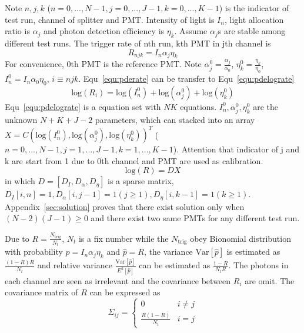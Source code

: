 Note $n,j,k$ ($n=0,...,N-1, j=0,...,J-1, k=0,...,K-1$) is the indicator of test run, channel of splitter and PMT. Intensity of light is $I_n$, light allocation ratio is $\alpha_j$ and photon detection efficiency is $\eta_k$. Assume $\alpha_j$s are stable among different test runs. The trigger rate of nth run, kth PMT in jth channel is
\begin{equation}
    \label{equ:pderate}
    R_{njk}=I_n\alpha_j\eta_k
\end{equation}
For convenience, 0th PMT is the reference PMT. Note $\alpha_j^0=\frac{\alpha_j}{\alpha_0}$, $\eta_k^0=\frac{\eta_k}{\eta_0}$, $I_n^0=I_n\alpha_0\eta_0$, $i\equiv njk$. Equ~\eqref{equ:pderate} can be transfer to Equ~\eqref{equ:pdelograte}
\begin{equation}
    \label{equ:pdelograte}
    \mathrm{log}(R_{i})=\mathrm{log}(I_n^0)+\mathrm{log}(\alpha_j^0)+\mathrm{log}(\eta_k^0)
\end{equation}
Equ~\eqref{equ:pdelograte} is a equation set with $NK$ equations. $I_n^0,\alpha_j^0,\eta_k^0$ are the unknown $N+K+J-2$ parameters, which can stacked into an array $X = C(\mathrm{log}(I_n^0), \mathrm{log}(\alpha_j^0),\mathrm{log}(\eta_k^0))^T$ ($n=0,...,N-1, j=1,...,J-1, k=1,...,K-1$). Attention that indicator of j and k are start from 1 due to 0th channel and PMT are used as calibration. 
\begin{equation}
    \mathrm{log}(R)=DX
\end{equation}
in which $D=[D_I,D_\alpha, D_\eta]$ is a sparse matrix, $D_I[i,n]=1,D_\alpha[{i},j-1]=1(j\geq1), D_\eta[{i},k-1]=1(k\geq1)$. 
Appendix~\ref{sec:solution} proves that there exist solution only when $(N-2)(J-1)\geq0$ and there exist two same PMTs for any different test run.

Due to $R=\frac{N_{\mathrm{trig}}}{N_t}$, $N_t$ is a fix number while the $N_{\mathrm{trig}}$ obey Bionomial distribution with probability $p=I_n\alpha_j\eta_k$ and $\hat{p}=R$, the variance $\mathrm{Var}[\hat{p}]$ is estimated as $\frac{(1-R)R}{N_t}$ and relative variance $\frac{\mathrm{Var}[\hat{p}]}{E^2[\hat{p}]}$ can be estimated as $\frac{1-R}{N_tR}$. The photons in each channel are seen as irrelevant and the covariance between $R_i$ are omit. The covariance matrix of $R$ can be expressed as
\begin{equation}
    \label{equ:variance}
    \Sigma_{ij}=\begin{cases}
        0 & i\neq j\\
        \frac{R(1-R)}{N_t} & i=j
    \end{cases}
\end{equation}

